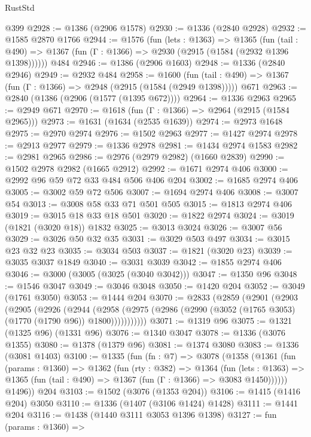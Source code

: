 \begin{lexlean}{RustStd}
\begin{coremodule}
{\begin{coremodule}
{{{{{{{{{{{{{{    @399
@2928 := @1386 (@2906 @1578)
@2930 := @1336 (@2840 @2928)
@2932 := @1585 @2870 @1766
@2944 := @1576
    (fun (lets : @1363) =>
    @1365
      (fun (tail : @490) => @1367 (fun (Γ : @1366) => @2930 (@2915 (@1584 (@2932 @1396 @1398))))))
    @484
@2946 := @1386 (@2906 @1603)
@2948 := @1336 (@2840 @2946)
@2949 := @2932 @484
@2958 := @1600
    (fun (tail : @490) => @1367 (fun (Γ : @1366) => @2948 (@2915 (@1584 (@2949 @1398)))))
    @671
@2963 := @2840 (@1386 (@2906 (@1577 (@1395 @672))))
@2964 := @1336 @2963
@2965 := @2949 @671
@2970 := @1618 (fun (Γ : @1366) => @2964 (@2915 (@1584 @2965)))
@2973 := @1631 (@1634 (@2535 @1639))
@2974 := @2973 @1648
@2975 := @2970 @2974
@2976 := @1502 @2963
@2977 := @1427 @2974
@2978 := @2913 @2977
@2979 := @1336 @2978
@2981 := @1434 @2974 @1583
@2982 := @2981 @2965
@2986 := @2976 (@2979 @2982) (@1660 @2839)
@2990 := @1502 @2978 @2982 (@1665 @2912)
@2992 := @1671 @2974 @406
@3000 := @2992 @96 @59 @72 @33 @484 @506 @406 @204
@3002 := @1685 @2974 @406
@3005 := @3002 @59 @72 @506
@3007 := @1694 @2974 @406
@3008 := @3007 @54
@3013 := @3008 @58 @33 @71 @501 @505
@3015 := @1813 @2974 @406
@3019 := @3015 @18 @33 @18 @501
@3020 := @1822 @2974
@3024 := @3019 (@1821 (@3020 @18)) @1832
@3025 := @3013 @3024
@3026 := @3007 @56
@3029 := @3026 @50 @32 @35
@3031 := @3029 @503 @497
@3034 := @3015 @23 @32 @23
@3035 := @3034 @503
@3037 := @1821 (@3020 @23)
@3039 := @3035 @3037 @1849
@3040 := @3031 @3039
@3042 := @1855 @2974 @406
@3046 := @3000 (@3005 (@3025 (@3040 @3042)))
@3047 := @1350 @96
@3048 := @1546 @3047
@3049 := @3046 @3048
@3050 := @1420 @204
@3052 := @3049 (@1761 @3050)
@3053 := @1444 @204
@3070 := @2833
    (@2859
      (@2901
        (@2903
          (@2905
            (@2926
              (@2944
                (@2958
                  (@2975 (@2986 (@2990 (@3052 (@1765 @3053) (@1770 (@1790 @96)) @1800)))))))))))
@3071 := @1319 @96
@3075 := @1321 (@1325 @96) (@1331 @96)
@3076 := @1340 @3047
@3078 := @1336 (@3076 @1355)
@3080 := @1378 (@1379 @96)
@3081 := @1374 @3080
@3083 := @1336 (@3081 @1403)
@3100 := @1335
    (fun (fn : @7) =>
    @3078
      (@1358
        (@1361
          (fun (params : @1360) =>
          @1362
            (fun (rty : @382) =>
            @1364
              (fun (lets : @1363) =>
              @1365 (fun (tail : @490) => @1367 (fun (Γ : @1366) => @3083 @1450))))))
        @1496))
    @204
@3103 := @1502 (@3076 (@1353 @204))
@3106 := @1415 (@1416 @204) @3050
@3110 := @1336 (@1407 (@3106 @1424) @1428)
@3111 := @1441 @204
@3116 := @1438 (@1440 @3111 @3053 @1396 @1398)
@3127 := fun (params : @1360) =>
}}}}}}}}}}}}}}
\end{coremodule}}
\end{coremodule}
\end{lexlean}
